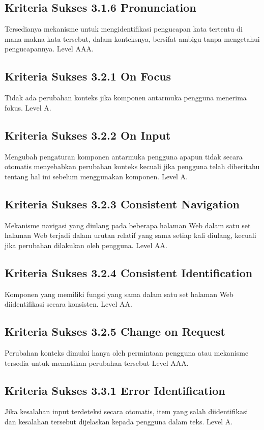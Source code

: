 \subsection{Kriteria Sukses 3.1.6 Pronunciation}
\label{sec:kriteria_3.1.6}
Tersedianya mekanisme untuk mengidentifikasi pengucapan kata tertentu di mana makna kata tersebut, dalam konteksnya, bersifat ambigu tanpa mengetahui pengucapannya.
Level AAA.

\subsection{Kriteria Sukses 3.2.1 On Focus}
\label{sec:kriteria_3.2.1}
Tidak ada perubahan konteks jika komponen antarmuka pengguna menerima fokus.
Level A.

\subsection{Kriteria Sukses 3.2.2 On Input}
\label{sec:kriteria_3.2.2}
Mengubah pengaturan komponen antarmuka pengguna apapun tidak secara otomatis menyebabkan perubahan konteks kecuali jika pengguna telah diberitahu tentang hal ini sebelum menggunakan komponen.
Level A.

\subsection{Kriteria Sukses 3.2.3 Consistent Navigation}
\label{sec:kriteria_3.2.3}
Mekanisme navigasi yang diulang pada beberapa halaman Web dalam satu set halaman Web terjadi dalam urutan relatif yang sama setiap kali diulang, kecuali jika perubahan dilakukan oleh pengguna.
Level AA.

\subsection{Kriteria Sukses 3.2.4 Consistent Identification}
\label{sec:kriteria_3.2.4}
Komponen yang memiliki fungsi yang sama dalam satu set halaman Web diidentifikasi secara konsisten.
Level AA.

\subsection{Kriteria Sukses 3.2.5 Change on Request}
\label{sec:kriteria_3.2.5}
Perubahan konteks dimulai hanya oleh permintaan pengguna atau mekanisme tersedia untuk mematikan perubahan tersebut
Level AAA.

\subsection{Kriteria Sukses 3.3.1 Error Identification}
\label{sec:kriteria_3.3.1}
Jika kesalahan input terdeteksi secara otomatis, item yang salah diidentifikasi dan kesalahan tersebut dijelaskan kepada pengguna dalam teks.
Level A.

